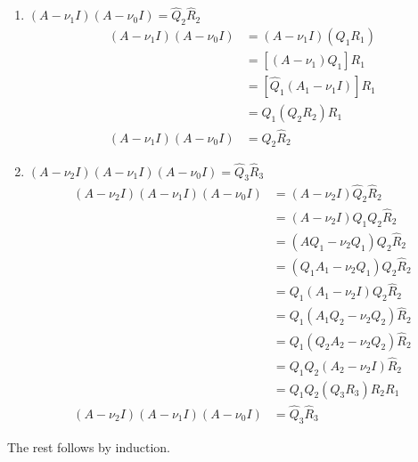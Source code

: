 \documentclass[10pt,letterpaper]{article}
\begin{document}
\begin{enumerate}[(a)]
\begin{enumerate}[$m=1$: ]
            \item $\left(A-\nu_1I\right)\left(A-\nu_0I\right) = \hat{Q}_2\hat{R}_2$
                \begin{subequations}\begin{align}
                    \left(A-\nu_1I\right)\left(A-\nu_0I\right) &= \left(A-\nu_1I\right)\left(Q_1R_1\right) \\
                     &= \left[ \left( A - \nu_1 \right)Q_1 \right]R_1 \\
                     &= \left[ \hat{Q}_1\left(A_1 - \nu_1I\right) \right]R_1 \\
                     &= \hat{Q}_1\left(Q_2R_2\right)R_1 \\
                    \left(A-\nu_1I\right)\left(A-\nu_0I\right) &= \hat{Q}_2\hat{R}_2
                \end{align}\end{subequations}

            \item $\left(A-\nu_2I\right)\left(A-\nu_1I\right)\left(A-\nu_0I\right) = \hat{Q}_3\hat{R}_3$
                \begin{subequations}\begin{align}
                    \left(A-\nu_2I\right)\left(A-\nu_1I\right)\left(A-\nu_0I\right) &= \left(A-\nu_2I\right)\hat{Q}_2\hat{R}_2 \\
                    &= \left(A-\nu_2I\right)Q_1Q_2\hat{R}_2 \\
                    &= \left(AQ_1-\nu_2Q_1\right)Q_2\hat{R}_2 \\
                    &= \left(Q_1A_1-\nu_2Q_1\right)Q_2\hat{R}_2 \\
                    &= Q_1\left(A_1-\nu_2I\right)Q_2\hat{R}_2 \\
                    &= Q_1\left(A_1Q_2-\nu_2Q_2\right)\hat{R}_2 \\
                    &= Q_1\left(Q_2A_2-\nu_2Q_2\right)\hat{R}_2 \\
                    &= Q_1Q_2\left(A_2-\nu_2I\right)\hat{R}_2 \\
                    &= Q_1Q_2\left(Q_3R_3\right)R_2R_1 \\
                    \left(A-\nu_2I\right)\left(A-\nu_1I\right)\left(A-\nu_0I\right) &= \hat{Q}_3\hat{R}_3
                \end{align}\end{subequations}
        \end{enumerate}
        The rest follows by induction.

\end{enumerate}
\end{document}
